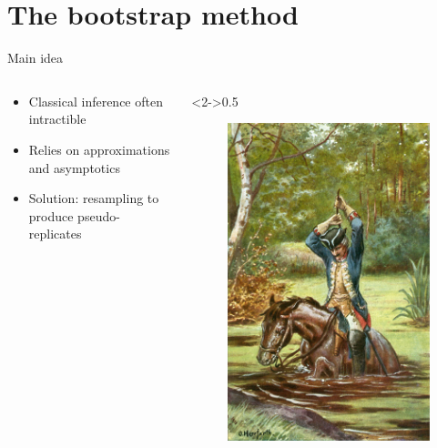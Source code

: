 \documentclass[tikz]{beamer}
\begin{document}
\section{The bootstrap method}

\begin{frame}{Main idea}
    \begin{columns}
        \begin{column}{0.5\linewidth}
            \begin{itemize}
                \item Classical inference often intractible
                \item Relies on approximations and asymptotics
                \item Solution: resampling to produce pseudo-replicates
            \end{itemize}
        \end{column}
        \begin{column}<2->{0.5\linewidth}
            \begin{figure}
                \includegraphics{munchausen.jpg}
            \end{figure}
        \end{column}
    \end{columns}
\end{frame}
\end{document}
